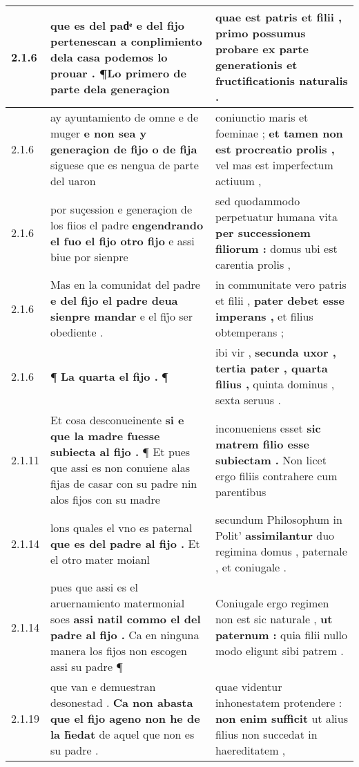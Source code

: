 \begin{tabular}{|p{1cm}|p{6.5cm}|p{6.5cm}|}
2.1.6 & que es del padͤ \textbf{ e del fijo pertenescan a conplimiento dela casa podemos lo prouar . } ¶Lo primero de parte dela generaçion & quae est patris et filii , \textbf{ primo possumus probare } ex parte generationis et fructificationis naturalis . \\\hline
2.1.6 & ay ayuntamiento de omne e de muger \textbf{ e non sea y generaçion de fijo o de fija } siguese que es nengua de parte del uaron & coniunctio maris et foeminae ; \textbf{ et tamen non est procreatio prolis , } vel mas est imperfectum actiuum , \\\hline
2.1.6 & por suçession e generaçion de los fiios el padre \textbf{ engendrando el fuo el fijo otro fijo } e assi biue por sienpre & sed quodammodo perpetuatur humana vita \textbf{ per successionem filiorum : } domus ubi est carentia prolis , \\\hline
2.1.6 & Mas en la comunidat del padre \textbf{ e del fijo el padre deua sienpre mandar } e el fij̉o ser obediente . & in communitate vero patris et filii , \textbf{ pater debet esse imperans , } et filius obtemperans ; \\\hline
2.1.6 & ¶ \textbf{ La quarta el fijo . } ¶ & ibi vir , \textbf{ secunda uxor , tertia pater , quarta filius , } quinta dominus , sexta seruus . \\\hline
2.1.11 & Et cosa desconueinente \textbf{ si e que la madre fuesse subiecta al fijo . } ¶ Et pues que assi es non conuiene alas fijas de casar con su padre nin alos fijos con su madre & inconueniens esset \textbf{ sic matrem filio esse subiectam . } Non licet ergo filiis contrahere cum parentibus \\\hline
2.1.14 & lons quales el vno es paternal \textbf{ que es del padre al fijo . } Et el otro mater moianl & secundum Philosophum in Polit’ \textbf{ assimilantur } duo regimina domus , paternale , et coniugale . \\\hline
2.1.14 & pues que assi es el aruernamiento matermonial soes \textbf{ assi natil commo el del padre al fijo . } Ca en ninguna manera los fijos non escogen assi su padre ¶ & Coniugale ergo regimen non est sic naturale , \textbf{ ut paternum : } quia filii nullo modo eligunt sibi patrem . \\\hline
2.1.19 & que van e demuestran desonestad . \textbf{ Ca non abasta que el fijo ageno non he de la h̃edat } de aquel que non es su padre . & quae videntur inhonestatem protendere : \textbf{ non enim sufficit } ut alius filius non succedat in haereditatem , \\\hline

\end{tabular}
